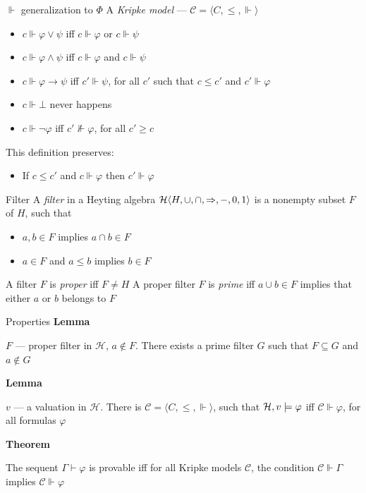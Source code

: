\documentclass[sans]{beamer}
\begin{document}
\begin{frame}{$\Vdash$ generalization to $\Phi$}
  A \emph{Kripke model} --- $\mathcal{C} = \langle C,\leq,{\Vdash} \rangle$
  \begin{itemize}
    \item $c \Vdash \varphi \vee \psi$ iff $c \Vdash \varphi$ or $c \Vdash \psi$
    \item $c \Vdash \varphi \wedge \psi$ iff $c \Vdash \varphi$ and $c \Vdash \psi$
    \item $c \Vdash \varphi \to \psi$ iff $c' \Vdash \psi$, for all $c'$ such that $c \leq c'$ and $c' \Vdash \varphi$
    \item $c \Vdash \bot$ never happens

    \vfill
    \pause
    \item $c \Vdash \lnot \varphi$ iff $c' \nVdash \varphi$, for all $c' \geq c$
  \end{itemize}

  \pause
  \vfill
  This definition preserves:
  \begin{itemize}
      \item If $c \leq c'$ and $c \Vdash \varphi$ then $c' \Vdash \varphi$
  \end{itemize}
\end{frame}

\begin{frame}{Filter}
  A \emph{filter} in a Heyting algebra $\mathcal{H} \langle H, \cup, \cap, \Rightarrow, -, 0, 1\rangle$ is a nonempty subset $F$ of $H$, such that
  \begin{itemize}
    \item $a, b \in F$ implies $a \cap b \in F$
    \item $a \in F$ and $a \leq b$ implies $b \in F$
  \end{itemize}

  \vfill
  A filter $F$ is \emph{proper} iff $F \neq H$
  \vfill
  A proper filter $F$ is \emph{prime} iff $a \cup b \in F$ implies that either $a$ or $b$ belongs to $F$
\end{frame}

\begin{frame}{Properties}
  \textbf{Lemma}

  $F$ --- proper filter in $\mathcal{H}$, $a \notin F$. There exists a prime filter $G$ such that $F \subseteq G$ and $a \notin G$
  \vfill

  \pause
  \textbf{Lemma}

  $v$ --- a valuation in $\mathcal{H}$. There is $\mathcal{C} = \langle C, \leq, \Vdash \rangle$,
  such that $\mathcal{H}, v \models \varphi$ iff $\mathcal{C} \Vdash \varphi$, for all formulas $\varphi$
  
  \vfill

  \pause
  \textbf{Theorem}

  The sequent $\Gamma \vdash \varphi$ is provable iff for all Kripke models $\mathcal{C}$, the condition
  $\mathcal{C} \Vdash \Gamma$ implies $\mathcal{C} \Vdash \varphi$

\end{frame}
\end{document}
